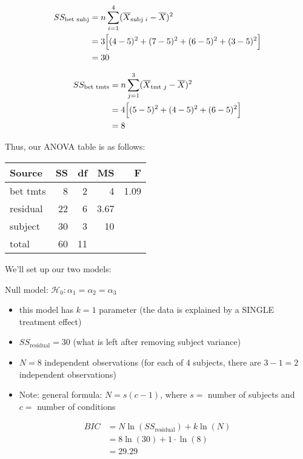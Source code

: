 \documentclass[portrait,footrule,17pt]{foils}
\begin{document}
\begin{align*}
SS_{\text{bet subj}} &= n\sum_{i=1}^4 (\overline{X}_{\text{subj }i}-\overline{X})^2\\
&=3\Bigl[(4-5)^2+(7-5)^2+(6-5)^2+(3-5)^2\Bigr]\\
&=30\\
\end{align*}

\foilhead[-1cm]{}
\label{sec:orga1de225}
\begin{align*}
SS_{\text{bet tmts}} &= n\sum_{j=1}^3 (\overline{X}_{\text{tmt }j}-\overline{X})^2\\
&= 4\Bigl[(5-5)^2 + (4-5)^2 + (6-5)^2\Bigr]\\
&= 8
\end{align*}

Thus, our ANOVA table is as follows:

\begin{center}
\begin{tabular}{lrrrr}
Source & SS & df & MS & F\\
\hline
bet tmts & 8 & 2 & 4 & 1.09\\
residual & 22 & 6 & 3.67 & \\
subject & 30 & 3 & 10 & \\
total & 60 & 11 &  & \\
\end{tabular}
\end{center}

\label{sec:org4bfd114}
We'll set up our two models:

Null model: \(\mathcal{H}_0:\alpha_1 = \alpha_2 = \alpha_3\)  
\begin{itemize}
\item this model has \(k=1\) parameter (the data is explained by a SINGLE treatment effect)
\item \(SS_{\text{residual}} = 30\) (what is left after removing subject variance)
\item \(N=8\) independent observations (for each of 4 subjects, there are \(3-1=2\) independent observations)
\item Note: general formula: \(N=s(c-1)\), where \(s=\) number of subjects and \(c=\) number of conditions
\end{itemize}

\begin{align*}
BIC &= N\ln (SS_{\text{residual}})+k\ln(N)\\
&= 8\ln(30) + 1\cdot \ln(8)\\
&= 29.29\\
\end{align*}
\end{document}
